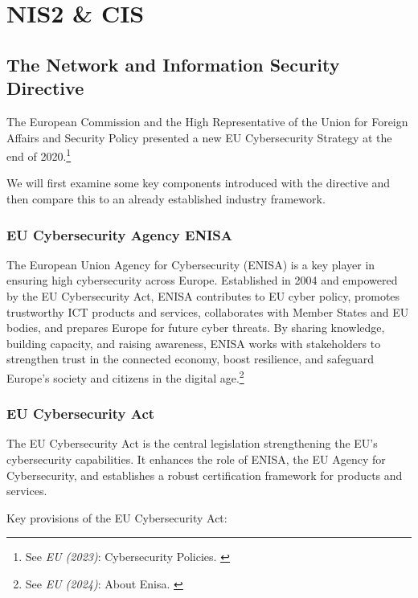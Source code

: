 %
%

\pagebreak
\section{NIS2 \& CIS}

\onehalfspacing

\subsection{The Network and Information Security Directive}

The European Commission and the High Representative of the Union for Foreign Affairs and Security Policy presented a new EU Cybersecurity Strategy at the end of 2020.\footnote{See \textit{EU (2023)}: Cybersecurity Policies. \cite{cyberPol}}

We will first examine some key components introduced with the directive and then compare this to an already established industry framework.

\subsubsection{EU Cybersecurity Agency ENISA}

The European Union Agency for Cybersecurity (ENISA) is a key player in ensuring high cybersecurity across Europe. Established in 2004 and empowered by the EU Cybersecurity Act, ENISA contributes to EU cyber policy, promotes trustworthy ICT products and services, collaborates with Member States and EU bodies, and prepares Europe for future cyber threats. By sharing knowledge, building capacity, and raising awareness, ENISA works with stakeholders to strengthen trust in the connected economy, boost resilience, and safeguard Europe's society and citizens in the digital age.\footnote{See \textit{EU (2024)}: About Enisa. \cite{aboutEnisa}}

\subsubsection{EU Cybersecurity Act}

The EU Cybersecurity Act is the central legislation strengthening the EU's cybersecurity capabilities. It enhances the role of ENISA, the EU Agency for Cybersecurity, and establishes a robust certification framework for products and services.

Key provisions of the EU Cybersecurity Act:

